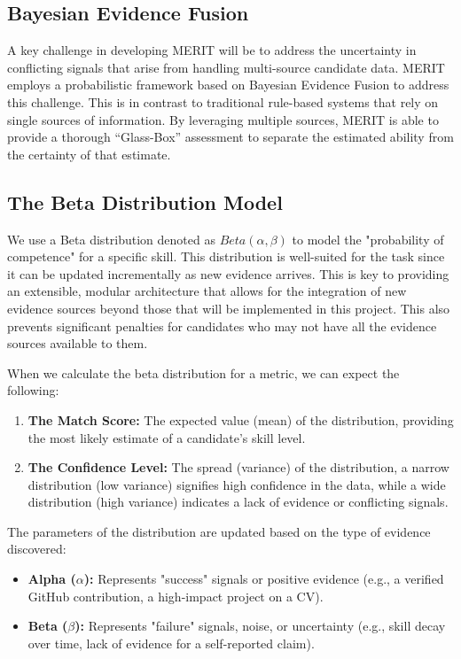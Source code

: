\subsection*{Bayesian Evidence Fusion}

A key challenge in developing MERIT will be to address the uncertainty in conflicting signals that arise from handling multi-source candidate data.
MERIT employs a probabilistic framework based on Bayesian Evidence Fusion to address this challenge.
This is in contrast to traditional rule-based systems that rely on single sources of information.
By leveraging multiple sources, MERIT is able to provide a thorough ``Glass-Box'' assessment to separate the estimated ability from the certainty of that estimate.

\subsection*{The Beta Distribution Model}
We use a Beta distribution denoted as $Beta(\alpha, \beta)$ to model the "probability of competence" for a specific skill.
This distribution is well-suited for the task since it can be updated incrementally as new evidence arrives.
This is key to providing an extensible, modular architecture that allows for the integration of new evidence sources beyond those that will be implemented in this project.
This also prevents significant penalties for candidates who may not have all the evidence sources available to them.

When we calculate the beta distribution for a metric, we can expect the following:
\begin{enumerate}
    \item \textbf{The Match Score:} The expected value (mean) of the distribution, providing the most likely estimate of a candidate's skill level.
    \item \textbf{The Confidence Level:} The spread (variance) of the distribution, a narrow distribution (low variance) signifies high confidence in the data, while a wide distribution (high variance) indicates a lack of evidence or conflicting signals.
\end{enumerate}

The parameters of the distribution are updated based on the type of evidence discovered:
\begin{itemize}
    \item \textbf{Alpha ($\alpha$):} Represents "success" signals or positive evidence (e.g., a verified GitHub contribution, a high-impact project on a CV).
    \item \textbf{Beta ($\beta$):} Represents "failure" signals, noise, or uncertainty (e.g., skill decay over time, lack of evidence for a self-reported claim).
\end{itemize}

